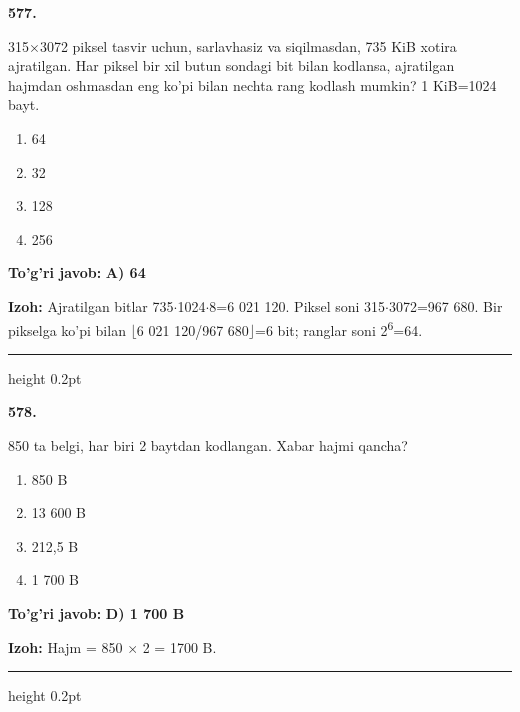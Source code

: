 \documentclass[10pt,a4paper,oneside]{article}
\begin{document}
\noindent\textbf{\color{ink}577.}
\par
315\ensuremath{\times}3072 piksel tasvir uchun, sarlavhasiz va siqilmasdan, 735 KiB xotira ajratilgan. Har piksel bir xil butun sondagi bit bilan kodlansa, ajratilgan hajmdan oshmasdan eng ko'pi bilan nechta rang kodlash mumkin? 1 KiB=1024 bayt.
\begin{enumerate}[label=\Alph*),leftmargin=9mm]
\item 64
\item 32
\item 128
\item 256
\end{enumerate}
\begin{tcolorbox}[enhanced,breakable,colback=teal!4,colframe=teal!50!black,boxrule=0.5pt,arc=1.1mm,left=3mm,right=3mm,top=1.7mm,bottom=1.7mm,before skip=2mm,after skip=2mm]
\textbf{\color{teal}To'g'ri javob:} \textbf{A) 64}
\par\smallskip
\textbf{Izoh:} Ajratilgan bitlar 735\ensuremath{\cdot}1024\ensuremath{\cdot}8=6 021 120. Piksel soni 315\ensuremath{\cdot}3072=967 680. Bir pikselga ko'pi bilan \ensuremath{\lfloor}6 021 120/967 680\ensuremath{\rfloor}=6 bit; ranglar soni 2\textsuperscript{6}=64.
\end{tcolorbox}
\vspace{2mm}\hrule height 0.2pt \vspace{3mm}

\noindent\textbf{\color{ink}578.}
\par
850 ta belgi, har biri 2 baytdan kodlangan. Xabar hajmi qancha?
\begin{enumerate}[label=\Alph*),leftmargin=9mm]
\item 850 B
\item 13 600 B
\item 212,5 B
\item 1 700 B
\end{enumerate}
\begin{tcolorbox}[enhanced,breakable,colback=teal!4,colframe=teal!50!black,boxrule=0.5pt,arc=1.1mm,left=3mm,right=3mm,top=1.7mm,bottom=1.7mm,before skip=2mm,after skip=2mm]
\textbf{\color{teal}To'g'ri javob:} \textbf{D) 1 700 B}
\par\smallskip
\textbf{Izoh:} Hajm = 850 \ensuremath{\times} 2 = 1700 B.
\end{tcolorbox}
\vspace{2mm}\hrule height 0.2pt \vspace{3mm}
\end{document}
